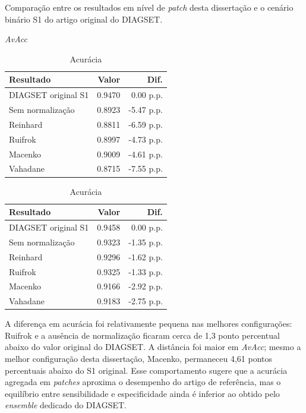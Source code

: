 \begin{table}[!htb]
\centering
\caption{Comparação entre os resultados em nível de \textit{patch} desta dissertação e o cenário binário S1 do artigo original do DIAGSET.}
\label{tab:results_diagset-original-comparison}
\scriptsize
\begin{subtable}[t]{0.48\textwidth}
\centering
\caption{\textit{AvAcc}}
\begin{tabular}{@{}lrr@{}}
\toprule
Resultado & Valor & Dif. \\
\midrule
DIAGSET original S1 & 0.9470 & 0.00 p.p. \\
Sem normalização & 0.8923 & -5.47 p.p. \\
Reinhard & 0.8811 & -6.59 p.p. \\
Ruifrok & 0.8997 & -4.73 p.p. \\
Macenko & 0.9009 & -4.61 p.p. \\
Vahadane & 0.8715 & -7.55 p.p. \\
\bottomrule
\end{tabular}
\end{subtable}
\hfill
\begin{subtable}[t]{0.48\textwidth}
\centering
\caption{Acurácia}
\begin{tabular}{@{}lrr@{}}
\toprule
Resultado & Valor & Dif. \\
\midrule
DIAGSET original S1 & 0.9458 & 0.00 p.p. \\
Sem normalização & 0.9323 & -1.35 p.p. \\
Reinhard & 0.9296 & -1.62 p.p. \\
Ruifrok & 0.9325 & -1.33 p.p. \\
Macenko & 0.9166 & -2.92 p.p. \\
Vahadane & 0.9183 & -2.75 p.p. \\
\bottomrule
\end{tabular}
\end{subtable}
\end{table}

A diferença em acurácia foi relativamente pequena nas melhores configurações:
Ruifrok e a ausência de normalização ficaram cerca de 1{,}3 ponto percentual
abaixo do valor original do DIAGSET. A distância foi maior em \textit{AvAcc};
mesmo a melhor configuração desta dissertação, Macenko, permaneceu 4{,}61 pontos
percentuais abaixo do S1 original. Esse comportamento sugere que a acurácia
agregada em \textit{patches} aproxima o desempenho do artigo de referência, mas
o equilíbrio entre sensibilidade e especificidade ainda é inferior ao obtido pelo
\textit{ensemble} dedicado do DIAGSET.

